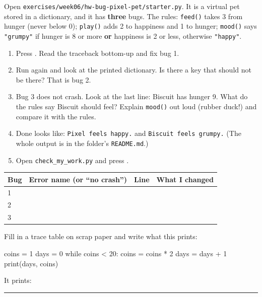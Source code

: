 \namedateline

\begin{core}
Open \texttt{exercises/week06/hw-bug-pixel-pet/starter.py}. It is a virtual pet stored in a dictionary, and it has \textbf{three} bugs.
The rules: \texttt{feed()} takes 3 from hunger (never below 0); \texttt{play()} adds 2 to happiness and 1 to hunger;
\texttt{mood()} says \texttt{"grumpy"} if hunger is 8 or more \textbf{or} happiness is 2 or less, otherwise \texttt{"happy"}.
\begin{enumerate}[leftmargin=1.4em]
  \item Press . Read the traceback bottom-up and fix bug 1.
  \item Run again and look at the printed dictionary. Is there a key that should not be there? That is bug 2.
  \item Bug 3 does not crash. Look at the last line: Biscuit has hunger 9. What do the rules say Biscuit should feel?
        Explain \texttt{mood()} out loud (rubber duck!) and compare it with the rules.
  \item Done looks like: \texttt{Pixel feels happy.} and \texttt{Biscuit feels grumpy.} (The whole output is in the folder's \texttt{README.md}.)
  \item Open \texttt{check\_my\_work.py} and press .
\end{enumerate}
\renewcommand{\arraystretch}{1.6}
\begin{tabular}{|p{1.4cm}|p{3.2cm}|p{1.3cm}|p{6.4cm}|}
\hline \textbf{Bug} & \textbf{Error name (or \enquote{no crash})} & \textbf{Line} & \textbf{What I changed} \\ \hline
1 & & & \\ \hline
2 & & & \\ \hline
3 & & & \\ \hline
\end{tabular}
\end{core}

\begin{challenge}[Trace it]
Fill in a trace table on scrap paper and write what this prints:
\begin{pycode}
coins = 1
days = 0
while coins < 20:
    coins = coins * 2
    days = days + 1
print(days, coins)
\end{pycode}
It prints: \rule{3cm}{0.4pt}
\end{challenge}

